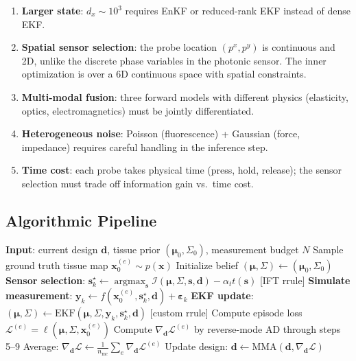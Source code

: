 \documentclass[11pt,a4paper]{article}
\newcommand{\argmax}{\operatorname{argmax}}
\theoremstyle{definition}
\begin{document}
\begin{enumerate}[nosep]
  \item \textbf{Larger state}: $d_x \sim 10^3$ requires EnKF or reduced-rank EKF instead of dense EKF.
  \item \textbf{Spatial sensor selection}: the probe location $(p^x, p^y)$ is continuous and 2D, unlike the discrete phase variables in the photonic sensor.  The inner optimization is over a 6D continuous space with spatial constraints.
  \item \textbf{Multi-modal fusion}: three forward models with different physics (elasticity, optics, electromagnetics) must be jointly differentiated.
  \item \textbf{Heterogeneous noise}: Poisson (fluorescence) + Gaussian (force, impedance) requires careful handling in the inference step.
  \item \textbf{Time cost}: each probe takes physical time (press, hold, release); the sensor selection must trade off information gain vs.\ time cost.
\end{enumerate}

\subsection{Algorithmic Pipeline}

\begin{algorithm}[h]
\caption{One outer optimization iteration for robotic surgical instrument design}
\begin{algorithmic}[1]
\STATE \textbf{Input}: current design $\bm{d}$, tissue prior $(\bm{\mu}_0, \Sigma_0)$, measurement budget $N$
  \STATE Sample ground truth tissue map $\bm{x}_0^{(e)} \sim p(\bm{x})$
  \STATE Initialize belief $(\bm{\mu}, \Sigma) \gets (\bm{\mu}_0, \Sigma_0)$
    \STATE \textbf{Sensor selection}: $\bm{s}_k^\star \gets \argmax_{\bm{s}} \mathcal{I}(\bm{\mu}, \Sigma, \bm{s}, \bm{d}) - \alpha_t t(\bm{s})$ \hfill [IFT rrule]
    \STATE \textbf{Simulate measurement}: $\bm{y}_k \gets f(\bm{x}_0^{(e)}, \bm{s}_k^\star, \bm{d}) + \bm{\varepsilon}_k$
    \STATE \textbf{EKF update}: $(\bm{\mu}, \Sigma) \gets \text{EKF}(\bm{\mu}, \Sigma, \bm{y}_k, \bm{s}_k^\star, \bm{d})$ \hfill [custom rrule]
  \ENDFOR
  \STATE Compute episode loss $\mathcal{L}^{(e)} = \ell(\bm{\mu}, \Sigma, \bm{x}_0^{(e)})$
  \STATE Compute $\nabla_{\bm{d}} \mathcal{L}^{(e)}$ by reverse-mode AD through steps 5--9
\ENDFOR
\STATE Average: $\nabla_{\bm{d}} \mathcal{L} \gets \frac{1}{n_{\text{mc}}} \sum_e \nabla_{\bm{d}} \mathcal{L}^{(e)}$
\STATE Update design: $\bm{d} \gets \text{MMA}(\bm{d}, \nabla_{\bm{d}} \mathcal{L})$
\end{algorithmic}
\end{algorithm}
\end{document}
